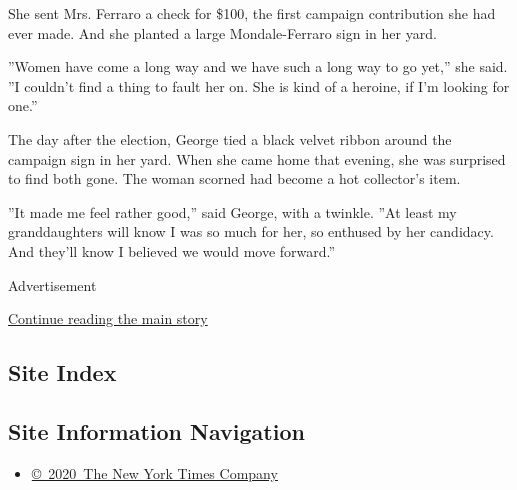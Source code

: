 She sent Mrs. Ferraro a check for \$100, the first campaign contribution
she had ever made. And she planted a large Mondale-Ferraro sign in her
yard.

''Women have come a long way and we have such a long way to go yet,''
she said. ''I couldn't find a thing to fault her on. She is kind of a
heroine, if I'm looking for one.''

The day after the election, George tied a black velvet ribbon around the
campaign sign in her yard. When she came home that evening, she was
surprised to find both gone. The woman scorned had become a hot
collector's item.

''It made me feel rather good,'' said George, with a twinkle. ''At least
my granddaughters will know I was so much for her, so enthused by her
candidacy. And they'll know I believed we would move forward.''

Advertisement

\protect\hyperlink{after-bottom}{Continue reading the main story}

\hypertarget{site-index}{%
\subsection{Site Index}\label{site-index}}

\hypertarget{site-information-navigation}{%
\subsection{Site Information
Navigation}\label{site-information-navigation}}

\begin{itemize}
\tightlist
\item
  \href{https://help.nytimes.com/hc/en-us/articles/115014792127-Copyright-notice}{©~2020~The
  New York Times Company}
\end{itemize}

